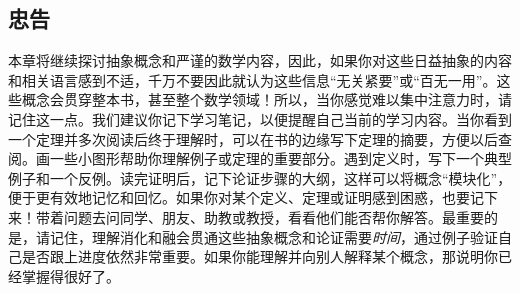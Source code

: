 
\subsection{忠告}

本章将继续探讨抽象概念和严谨的数学内容，因此，如果你对这些日益抽象的内容和相关语言感到不适，千万不要因此就认为这些信息``无关紧要''或``百无一用''。这些概念会贯穿整本书，甚至整个数学领域！所以，当你感觉难以集中注意力时，请记住这一点。我们建议你记下学习笔记，以便提醒自己当前的学习内容。当你看到一个定理并多次阅读后终于理解时，可以在书的边缘写下定理的摘要，方便以后查阅。画一些小图形帮助你理解例子或定理的重要部分。遇到定义时，写下一个典型例子和一个反例。读完证明后，记下论证步骤的大纲，这样可以将概念``模块化''，便于更有效地记忆和回忆。如果你对某个定义、定理或证明感到困惑，也要记下来！带着问题去问同学、朋友、助教或教授，看看他们能否帮你解答。最重要的是，请记住，理解消化和融会贯通这些抽象概念和论证需要\emph{时间}，通过例子验证自己是否跟上进度依然非常重要。如果你能理解并向别人解释某个概念，那说明你已经掌握得很好了。